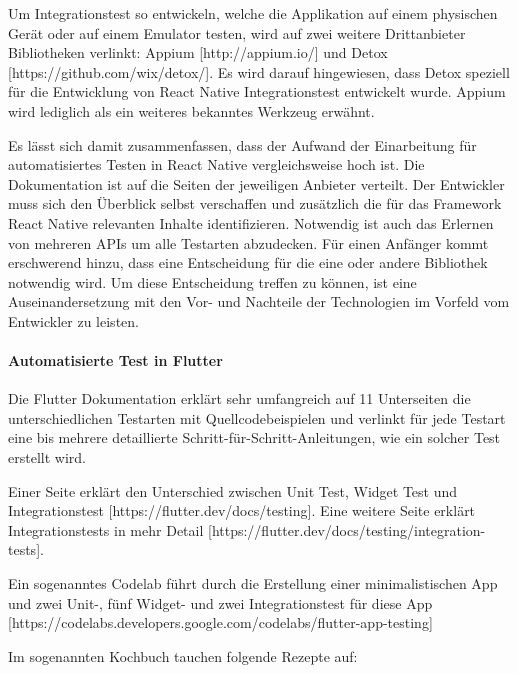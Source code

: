 Um Integrationstest  so entwickeln, welche die Applikation auf einem physischen Gerät oder auf einem Emulator testen, wird auf zwei weitere Drittanbieter Bibliotheken verlinkt: Appium [http://appium.io/] und Detox [https://github.com/wix/detox/]. Es wird darauf hingewiesen, dass Detox speziell für die Entwicklung von React Native Integrationstest entwickelt wurde. Appium wird lediglich als ein weiteres  bekanntes Werkzeug erwähnt. 

Es lässt sich damit zusammenfassen, dass der Aufwand der Einarbeitung für automatisiertes Testen in React Native vergleichsweise hoch ist. Die Dokumentation ist auf die Seiten der jeweiligen Anbieter verteilt. Der Entwickler muss sich den Überblick selbst verschaffen und zusätzlich die für das Framework React Native relevanten Inhalte identifizieren. Notwendig ist auch das Erlernen von mehreren APIs um alle Testarten abzudecken. Für einen Anfänger kommt erschwerend hinzu, dass eine Entscheidung für die eine oder andere Bibliothek notwendig wird. Um diese Entscheidung treffen zu können, ist eine Auseinandersetzung mit den Vor- und Nachteile der Technologien im Vorfeld vom Entwickler zu leisten.




\paragraph{Automatisierte Test in Flutter} Die Flutter Dokumentation erklärt sehr umfangreich auf 11 Unterseiten die unterschiedlichen Testarten mit Quellcodebeispielen und verlinkt für jede Testart eine bis mehrere detaillierte Schritt-für-Schritt-Anleitungen, wie ein solcher Test erstellt wird.

Einer Seite erklärt den Unterschied zwischen Unit Test, Widget Test und Integrationstest [https://flutter.dev/docs/testing]. Eine weitere Seite erklärt Integrationstests in mehr Detail [https://flutter.dev/docs/testing/integration-tests]. 

Ein sogenanntes Codelab führt durch die Erstellung einer minimalistischen App und zwei Unit-, fünf Widget- und zwei Integrationstest für diese App [https://codelabs.developers.google.com/codelabs/flutter-app-testing]

Im sogenannten Kochbuch tauchen folgende Rezepte auf:

